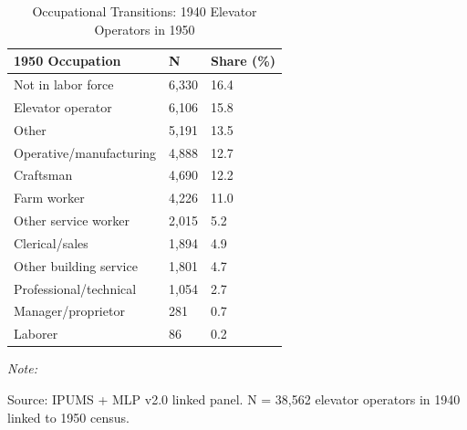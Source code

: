 \begin{table}[!h]
\centering
\caption{Occupational Transitions: 1940 Elevator Operators in 1950}
\centering
\begin{threeparttable}
\begin{tabular}[t]{lll}
\toprule
1950 Occupation & N & Share (\%)\\
\midrule
Not in labor force & 6,330 & 16.4\\
Elevator operator & 6,106 & 15.8\\
Other & 5,191 & 13.5\\
Operative/manufacturing & 4,888 & 12.7\\
Craftsman & 4,690 & 12.2\\
\addlinespace
Farm worker & 4,226 & 11.0\\
Other service worker & 2,015 & 5.2\\
Clerical/sales & 1,894 & 4.9\\
Other building service & 1,801 & 4.7\\
Professional/technical & 1,054 & 2.7\\
\addlinespace
Manager/proprietor & 281 & 0.7\\
Laborer & 86 & 0.2\\
\bottomrule
\end{tabular}
\begin{tablenotes}
\item \textit{Note: } 
\item Source: IPUMS + MLP v2.0 linked panel. N = 38,562 elevator operators in 1940 linked to 1950 census.
\end{tablenotes}
\end{threeparttable}
\end{table}
